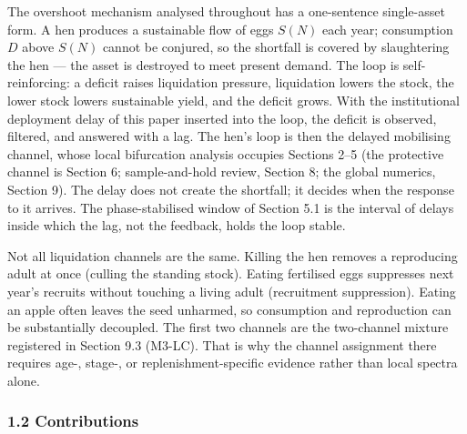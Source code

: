 \documentclass[11pt]{article}
\begin{document}
The overshoot mechanism analysed throughout has a one-sentence
single-asset form. A hen produces a sustainable flow of eggs \(S(N)\)
each year; consumption \(D\) above \(S(N)\) cannot be conjured, so the
shortfall is covered by slaughtering the hen --- the asset is destroyed
to meet present demand. The loop is self-reinforcing: a deficit raises
liquidation pressure, liquidation lowers the stock, the lower stock
lowers sustainable yield, and the deficit grows. With the institutional
deployment delay of this paper inserted into the loop, the deficit is
observed, filtered, and answered with a lag. The hen's loop is then the
delayed mobilising channel, whose local bifurcation analysis occupies
Sections 2--5 (the protective channel is Section 6; sample-and-hold
review, Section 8; the global numerics, Section 9). The delay does not
create the shortfall; it decides when the response to it arrives. The
phase-stabilised window of Section 5.1 is the interval of delays inside
which the lag, not the feedback, holds the loop stable.

Not all liquidation channels are the same. Killing the hen removes a
reproducing adult at once (culling the standing stock). Eating
fertilised eggs suppresses next year's recruits without touching a
living adult (recruitment suppression). Eating an apple often leaves the
seed unharmed, so consumption and reproduction can be substantially
decoupled. The first two channels are the two-channel mixture registered
in Section 9.3 (M3-LC). That is why the channel assignment there
requires age-, stage-, or replenishment-specific evidence rather than
local spectra alone.

\subsubsection{1.2 Contributions}\label{contributions}
\end{document}
